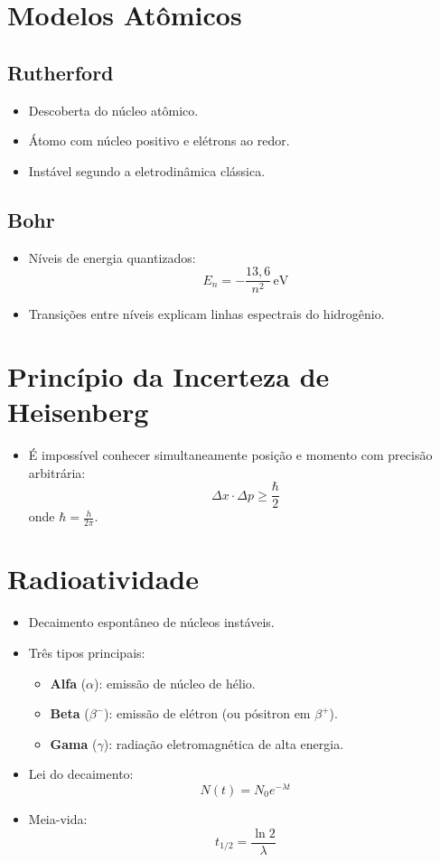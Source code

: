 \documentclass[a4paper,12pt]{article}
\begin{document}
\begin{multicols}{2}
\section{Modelos Atômicos}
\subsection{Rutherford}
\begin{itemize}
    \item Descoberta do núcleo atômico.
    \item Átomo com núcleo positivo e elétrons ao redor.
    \item Instável segundo a eletrodinâmica clássica.
\end{itemize}

\subsection{Bohr}
\begin{itemize}
    \item Níveis de energia quantizados:
    \[
        E_n = -\frac{13{,}6}{n^2} \, \text{eV}
    \]
    \item Transições entre níveis explicam linhas espectrais do hidrogênio.
\end{itemize}

\section{Princípio da Incerteza de Heisenberg}
\begin{itemize}
    \item É impossível conhecer simultaneamente posição e momento com precisão arbitrária:
    \[
        \Delta x \cdot \Delta p \geq \frac{\hbar}{2}
    \]
    onde $\hbar = \frac{h}{2\pi}$.
\end{itemize}

\section{Radioatividade}
\begin{itemize}
    \item Decaimento espontâneo de núcleos instáveis.
    \item Três tipos principais:
    \begin{itemize}
        \item \textbf{Alfa} ($\alpha$): emissão de núcleo de hélio.
        \item \textbf{Beta} ($\beta^-$): emissão de elétron (ou pósitron em $\beta^+$).
        \item \textbf{Gama} ($\gamma$): radiação eletromagnética de alta energia.
    \end{itemize}
    \item Lei do decaimento:
    \[
        N(t) = N_0 e^{-\lambda t}
    \]
    \item Meia-vida:
    \[
        t_{1/2} = \frac{\ln 2}{\lambda}
    \]
\end{itemize}


\end{multicols}
\end{document}
